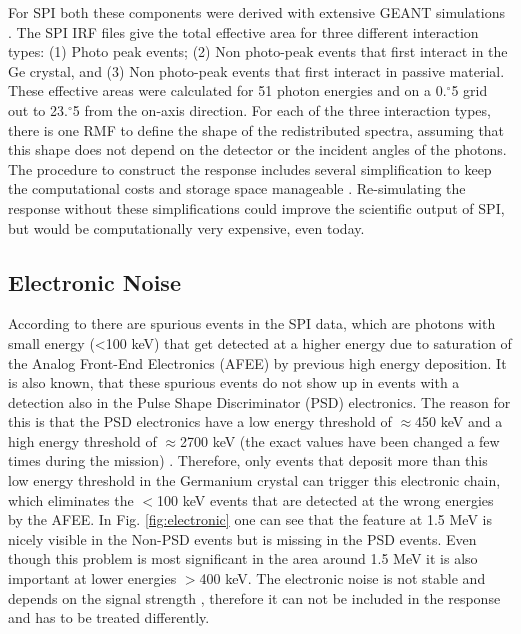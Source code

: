 \documentclass[twocolumn,traditabstract]{aa}
\def\fdg{\hbox{$.\!\!^\circ$}}          %
\begin{document}
For SPI both these components were derived with extensive GEANT simulations \citep{spi_response}.
The SPI IRF files give the total effective area for three different interaction types:
 (1) Photo peak events;
 (2) Non photo-peak events that first interact in the Ge crystal, and
 (3) Non photo-peak events that first interact in passive material.
These effective areas were calculated for 51 photon energies and on a 0\fdg5  grid out to 23\fdg5 from the on-axis direction. For each of the three interaction types, there is one RMF to define the shape of the redistributed spectra, assuming that this shape does not depend on the detector or the incident angles of the photons. The procedure to construct the response includes several simplification to keep the computational costs and storage space manageable \citep{spi_response}. Re-simulating the response without these simplifications could improve the scientific output of SPI, but would be computationally very expensive, even today.


\subsection{Electronic Noise}
\label{electronic}
According to \citet{spi_electronic_noise} there are spurious events in the SPI data, which are photons with small energy (<100 keV) that get detected at a higher energy due to saturation of the Analog Front-End Electronics (AFEE) by previous high energy deposition. It is also known, that these spurious events do not show up in events with a detection also in the Pulse Shape Discriminator (PSD) electronics. The reason for this is that the PSD electronics have a low energy threshold of $\approx$450 keV and a high energy threshold of $\approx$2700 keV (the exact values have been changed a few times during the mission) \citep{spi_electronic_noise}. Therefore, only events that deposit more than this low energy threshold in the Germanium crystal can trigger this electronic chain, which eliminates the $<$100 keV events that are detected at the wrong energies by the AFEE. In Fig. \ref{fig:electronic} one can see that the feature at 1.5 MeV is nicely visible in the Non-PSD events but is missing in the PSD events. Even though this problem is most significant in the area around 1.5 MeV it is also important at lower energies $>$400 keV. The electronic noise is not stable and depends on the signal strength \citep{spi_electronic_noise}, therefore it can not be included in the response and has to be treated differently.
\end{document}
